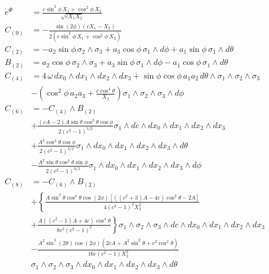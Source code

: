 
\begin{align*}
e^{\Phi} & =
\frac{c \sin^2\phi \, X_1+\cos^2\phi \,X_2}{\sqrt{c X_1 X_2}}\\
%
C_{(0)} & = 
-\frac{\sin(2 \phi ) (c X_1-X_2)}{2  (c \sin^2\phi \, X_1+\cos^2\phi \,X_2)}\\
%
C_{(2)} & = 
- a_2 \sin\phi \,
\sigma_2\wedge \sigma_3
+ a_3 \cos\phi \,
\sigma_1\wedge d\phi
+ a_1 \sin\phi \,
\sigma_1\wedge d\theta\\
% 
B_{(2)} & =
a_2 \cos\phi \,
\sigma_2\wedge \sigma_3
+ a_3 \sin\phi \,
\sigma_1\wedge d\phi
- a_1 \cos\phi \,
\sigma_1\wedge d\theta\\
% 
C_{(4)} & =
4 \, \omega \,
dx_0\wedge dx_1\wedge dx_2\wedge dx_3 
+ \sin\phi \cos\phi \, a_1 a_2 \,
d\theta\wedge \sigma_1\wedge \sigma_2\wedge \sigma_3\\
&
-\left(\cos ^2\phi \, a_2 a_3 +\frac{c \cos^4\theta}{X_2}\right) 
\sigma_1\wedge \sigma_2\wedge \sigma_3 \wedge d\phi \\
%
C_{(6)} &= - C_{(4)} \wedge B_{(2)}\\
&+\frac{(c A-2) A \sin\theta \cos^2\theta \cos\phi}{2 \left(c^2-1\right)^{5/2}} 
\sigma_1\wedge dc\wedge dx_0\wedge dx_1\wedge dx_2\wedge dx_3\\
&
+\frac{A^2 \cos^3\theta \cos\phi}{2 (c^2-1)^{3/2}}
\sigma_1\wedge dx_0 \wedge dx_1\wedge dx_2\wedge dx_3\wedge d\theta\\
&
-\frac{A^2 \sin\theta \cos^2\theta \sin\phi}{2 (c^2-1)^{3/2}}
\sigma_1\wedge dx_0 \wedge dx_1\wedge dx_2\wedge dx_3\wedge d\phi\\
%
C_{(8)} &= - C_{(6)} \wedge B_{(2)}\\
&+ \left\{ \frac{A \sin^2\theta \cos^4\theta \cos(2\phi) \left[ ((c^2+3) A-4 c) \cos^2\theta-2 A \right]}{4 (c^2-1)^2 X_2^2} \right.\\
&+ \left.\frac{A ((c^2-1) A + 4 c) \cos^4\theta}{8 c^2 (c^2-1)^2} \right\}
\sigma_1 \wedge \sigma_2\wedge \sigma_3\wedge dc\wedge dx_0\wedge dx_1\wedge dx_2\wedge dx_3\\
& -\frac{A^2 \sin^3(2 \theta ) \cos(2 \phi ) \left(2 c A + A^2 \sin^2\theta +c^2 \cos^2\theta\right)}{16 c (c^2-1) X_2^2}\\
&\sigma_1\wedge \sigma_2\wedge \sigma_3\wedge dx_0\wedge dx_1\wedge dx_2\wedge dx_3\wedge d\theta
\end{align*}
